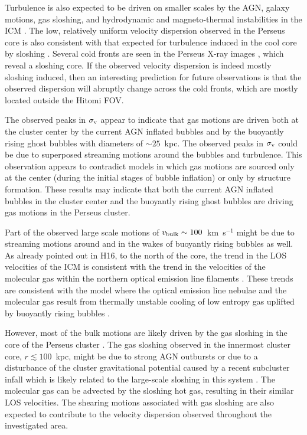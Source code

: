 Turbulence is also expected to be driven on smaller scales by the AGN, galaxy motions, gas sloshing, and hydrodynamic and magneto-thermal instabilities in the ICM \citep[e.g.][]{churazov2002,Gu13,mendygral2012,ichinohe17,ZuHone13,zuhone17}. The low, relatively uniform velocity dispersion observed in the Perseus core is also consistent with that expected for turbulence induced in the cool core by sloshing \citep{ZuHone13}. Several cold fronts are seen in the Perseus X-ray images \citep{Churazov03,simionescu2012,walker2017}, which reveal a sloshing core. If the observed velocity dispersion is indeed mostly sloshing induced, then an interesting prediction for future observations is that the observed dispersion will abruptly change across the cold fronts, which are mostly located outside the Hitomi FOV.

The observed peaks in $\sigma_{\rm v}$ appear to indicate that gas motions are driven both at the cluster center by the current AGN inflated bubbles and by the buoyantly rising ghost bubbles with diameters of $\sim25$~kpc. The observed peaks in $\sigma_{\rm v}$ could be due to superposed streaming motions around the bubbles and turbulence. This observation appears to contradict models in which gas motions are sourced only at the center (during the initial stages of bubble inflation) or only by structure formation. These results may indicate that both the current AGN inflated bubbles in the cluster center and the buoyantly rising ghost bubbles are driving gas motions in the Perseus cluster.

Part of the observed large scale motions of $v_{\rm bulk}\sim 100$~km~s$^{-1}$ might be due to streaming motions around and in the wakes of buoyantly rising bubbles as well. As already pointed out in H16, to the north of the core, the trend in the LOS velocities of the ICM is consistent with the trend in the velocities of the molecular gas within the northern optical emission line filaments \citep{salome2011}. These trends are consistent with the model where the optical emission line nebulae and the molecular gas result from thermally unstable cooling of low entropy gas uplifted by buoyantly rising bubbles \citep[e.g.][]{hatch2006,mcnamara2016}.

However, most of the bulk motions are likely driven by the gas sloshing in the core of the Perseus cluster \citep{Churazov03,walker2017,zuhone17}. The gas sloshing observed in the innermost cluster core, $r\lesssim100$~kpc, might be due to strong AGN outbursts \citep{Churazov03} or due to a disturbance of the cluster gravitational potential caused by a recent subcluster infall \citep[e.g.][]{markevitch2007} which is likely related to the large-scale sloshing in this system \citep{simionescu2012}. The molecular gas can be advected by the sloshing hot gas, resulting in their similar LOS velocities. The shearing motions associated with gas sloshing are also expected to contribute to the velocity dispersion observed throughout the investigated area.

